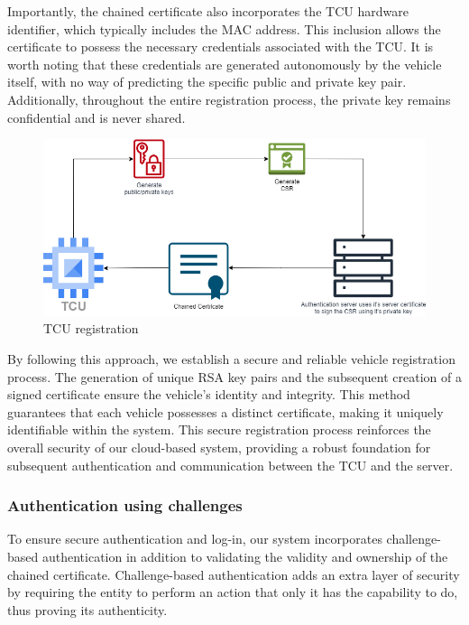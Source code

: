 \documentclass[
12pt,
oneside, 
onehalfspacing, 
nolistspacing, 
parskip, 
chapterinoneline, 
]{AASTCOMPUTER}
\begin{document}
Importantly, the chained certificate also incorporates the TCU hardware identifier, which typically includes the MAC address. This inclusion allows the certificate to possess the necessary credentials associated with the TCU. It is worth noting that these credentials are generated autonomously by the vehicle itself, with no way of predicting the specific public and private key pair. Additionally, throughout the entire registration process, the private key remains confidential and is never shared.

\begin{figure}[!ht]
	\centering
	\includegraphics[scale=0.5]{Figures/Architicture/tcu_register.drawio.png}
  	\caption{TCU registration}
  	\label{fig:TCU registration}
\end{figure}

By following this approach, we establish a secure and reliable vehicle registration process. The generation of unique RSA key pairs and the subsequent creation of a signed certificate ensure the vehicle's identity and integrity. This method guarantees that each vehicle possesses a distinct certificate, making it uniquely identifiable within the system. This secure registration process reinforces the overall security of our cloud-based system, providing a robust foundation for subsequent authentication and communication between the TCU and the server.
\newpage
\subsubsection{Authentication using challenges}
To ensure secure authentication and log-in, our system incorporates challenge-based authentication in addition to validating the validity and ownership of the chained certificate. Challenge-based authentication adds an extra layer of security by requiring the entity to perform an action that only it has the capability to do, thus proving its authenticity.
\end{document}
